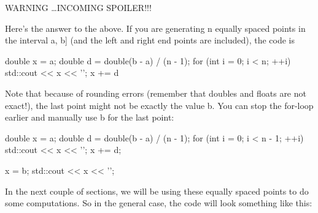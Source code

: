 

WARNING \ldots INCOMING SPOILER!!!

Here's the answer to the above. If you are generating n
equally spaced points in the interval a, b] (and the left and right
end points are included), the code is
\begin{console}
double x = a;
double d = double(b - a) / (n - 1);
for (int i = 0; i < n; ++i)
{   
    std::cout << x << '\n';
    x += d
}
\end{console}

Note that because of rounding errors (remember that doubles and floats
are not exact!), the last point might not be exactly the value b. You
can stop the for-loop earlier and manually use b for the last point:
\begin{console}
double x = a;
double d = double(b - a) / (n - 1);
for (int i = 0; i < n - 1; ++i)
{   
    std::cout << x << '\n';
    x += d;
}

x = b;
std::cout << x << '\n';
\end{console}

In the next couple of sections, we will be using these equally spaced
points to do some computations. So in the general case, the code will
look something like this:

